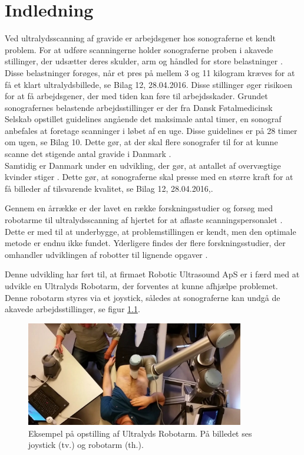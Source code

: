\chapter{Indledning} 
Ved ultralydsscanning af gravide er arbejdsgener hos sonograferne et kendt problem. For at udføre scanningerne holder sonograferne proben i akavede stillinger, der udsætter deres skulder, arm og håndled for store belastninger \cite{1}\cite{24}\cite{31}\cite{32}\cite{36}. Disse belastninger forøges, når et pres på mellem 3 og 11 kilogram kræves for at få et klart ultralydsbillede, se Bilag 12, 28.04.2016. Disse stillinger øger risikoen for at få arbejdsgener, der med tiden kan føre til arbejdsskader. Grundet sonografernes belastende arbejdsstillinger er der fra Dansk Føtalmedicinsk Selskab opstillet guidelines angående det maksimale antal timer, en sonograf anbefales at foretage scanninger i løbet af en uge. Disse guidelines er på 28 timer om ugen, se Bilag 10. Dette gør, at der skal flere sonografer til for at kunne scanne det stigende antal gravide i Danmark \cite{Foedsler}. \\
Samtidig er Danmark under en udvikling, der gør, at antallet af overvægtige kvinder stiger \cite{Overvaegt}. Dette gør, at sonograferne skal presse med en større kraft for at få billeder af tilsvarende kvalitet, se Bilag 12, 28.04.2016,\cite{24}\cite{31}\cite{8}. 

Gennem en årrække er der lavet en række forskningsstudier og forsøg med robotarme til ultralydsscanning af hjertet for at aflaste scanningspersonalet \cite{5}. Dette er med til at underbygge, at problemstillingen er kendt, men den optimale metode er endnu ikke fundet. Yderligere findes der flere forskningsstudier, der omhandler udviklingen af robotter til lignende opgaver \cite{8}\cite{5}\cite{18}. 

Denne udvikling har ført til, at firmaet Robotic Ultrasound ApS er i færd med at udvikle en Ultralyds Robotarm, der forventes at kunne afhjælpe problemet. Denne robotarm styres via et joystick, således at sonograferne kan undgå de akavede arbejdsstillinger, se figur \ref{opstilling}.  

\begin{figure}[H]\centering
	\includegraphics[width = 0.85\textwidth]{Figurer/ergonomiskLosning.jpg}
	\caption{Eksempel på opstilling af Ultralyds Robotarm. På billedet ses joystick (tv.) og robotarm (th.).  }
	\label{opstilling}
\end{figure}

